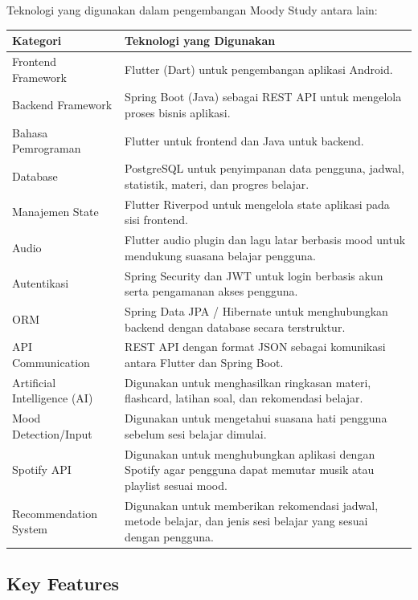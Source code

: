 \documentclass[11pt]{article}
\begin{document}
Teknologi yang digunakan dalam pengembangan Moody Study antara lain:

\begin{center}
\renewcommand{\arraystretch}{1.3}
\begin{tabular}{|>{\raggedright\arraybackslash}p{}|>{\raggedright\arraybackslash}p{}|}
\hline
\textbf{Kategori} & \textbf{Teknologi yang Digunakan} \\
\hline
Frontend Framework & Flutter (Dart) untuk pengembangan aplikasi Android. \\
\hline
Backend Framework & Spring Boot (Java) sebagai REST API untuk mengelola proses bisnis aplikasi. \\
\hline
Bahasa Pemrograman & Flutter untuk frontend dan Java untuk backend. \\
\hline
Database & PostgreSQL untuk penyimpanan data pengguna, jadwal, statistik, materi, dan progres belajar. \\
\hline
Manajemen State & Flutter Riverpod untuk mengelola state aplikasi pada sisi frontend. \\
\hline
Audio & Flutter audio plugin dan lagu latar berbasis mood untuk mendukung suasana belajar pengguna. \\
\hline
Autentikasi & Spring Security dan JWT untuk login berbasis akun serta pengamanan akses pengguna. \\
\hline
ORM & Spring Data JPA / Hibernate untuk menghubungkan backend dengan database secara terstruktur. \\
\hline
API Communication & REST API dengan format JSON sebagai komunikasi antara Flutter dan Spring Boot. \\
\hline
Artificial Intelligence (AI) & Digunakan untuk menghasilkan ringkasan materi, flashcard, latihan soal, dan rekomendasi belajar. \\
\hline
Mood Detection/Input & Digunakan untuk mengetahui suasana hati pengguna sebelum sesi belajar dimulai. \\
\hline
Spotify API & Digunakan untuk menghubungkan aplikasi dengan Spotify agar pengguna dapat memutar musik atau playlist sesuai mood. \\
\hline
Recommendation System & Digunakan untuk memberikan rekomendasi jadwal, metode belajar, dan jenis sesi belajar yang sesuai dengan pengguna. \\
\hline
\end{tabular}
\end{center}

\subsection{Key Features}
\end{document}

